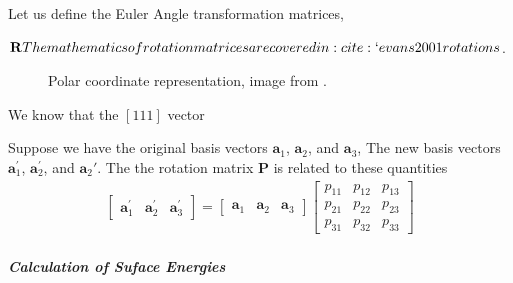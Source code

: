 \documentclass[letterpaper,10pt,english]{sphinxmanual}
\begin{document}
Let us define the Euler Angle transformation matrices,

\(\mathbf{R}
The mathematics of rotation matrices are covered in :cite:`evans2001rotations\).

\begin{figure}[htbp]
\centering
\capstart

\noindent{}
\caption{Polar coordinate representation, image from \label{\detokenize{calc_material_properties/calc_surface_energy:id2}}{\hyperref[\detokenize{calc_material_properties/calc_surface_energy:evans2001rotations}]{\sphinxcrossref{{[}Eva01{]}}}}.}\label{\detokenize{calc_material_properties/calc_surface_energy:id4}}\end{figure}

We know that the \([111]\) vector

Suppose we have the original basis vectors \(\mathbf{a}_1\), \(\mathbf{a}_2\), and \(\mathbf{a}_3\),
The new basis vectors \(\mathbf{a}_1^\prime\), \(\mathbf{a}_2^\prime\), and \(\mathbf{a}_2\prime\).  The the rotation matrix \(\mathbf{P}\) is related to these quantities
\begin{equation*}
\begin{split}\begin{bmatrix} \mathbf{a}_1^\prime & \mathbf{a}_2^\prime & \mathbf{a}_3^\prime \end{bmatrix} =
\begin{bmatrix} \mathbf{a}_1 & \mathbf{a}_2 & \mathbf{a}_3 \end{bmatrix}
\begin{bmatrix} p_{11} & p_{12} & p_{13} \\ p_{21} & p_{22} & p_{23} \\ p_{31} & p_{32} & p_{33} \end{bmatrix}\end{split}
\end{equation*}


\subparagraph{Calculation of Suface Energies}
\label{\detokenize{calc_material_properties/calc_surface_energy:calculation-of-suface-energies}}
\end{document}
